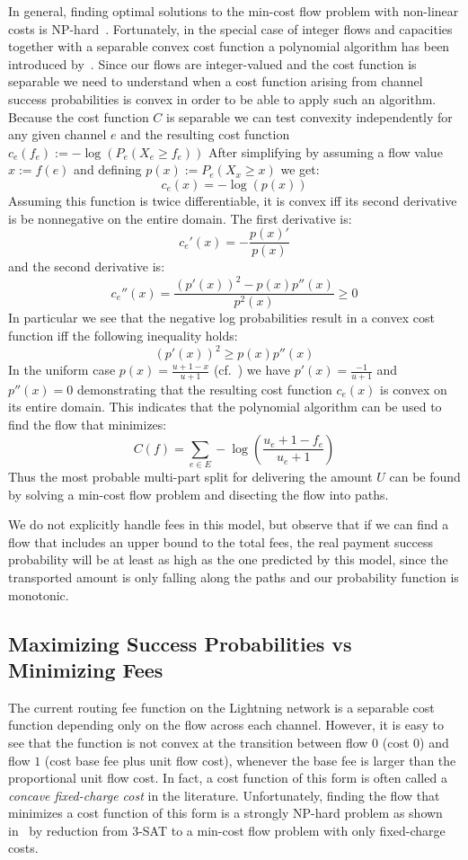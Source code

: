 \documentclass[10pt,twocolumn]{article}
\begin{document}
In general, finding optimal solutions to the min-cost flow problem with non-linear costs is NP-hard~\cite{guisewite1990minimum}. Fortunately, in the special case of integer flows and capacities together with a separable convex cost function a polynomial algorithm has been introduced by~\cite{Minoux1986}.
Since our flows are integer-valued and the cost function is separable we need to understand when a cost function arising from channel success probabilities is convex in order to be able to apply such an algorithm.
Because the cost function $C$ is separable we can test convexity independently for any given channel $e$ and the resulting cost function $c_e(f_e):=-\log\left(P_e(X_e\geq f_e)\right)$
After simplifying by assuming a flow value $x:=f(e)$ and defining $p(x):=P_e(X_x\geq x)$ we get:
\[
c_e(x)=-\log(p(x))
\]
Assuming this function is twice differentiable, it is convex iff its second derivative is be nonnegative on the entire domain.
The first derivative is:
\[
c_e'(x) = -\frac{p(x)'}{p(x)}
\]
and the second derivative is:
\[
c_e''(x) = \frac{(p'(x))^2-p(x)p''(x)}{{p^2(x)}} \geq 0
\]
In particular we see that the negative log probabilities result in a convex cost function iff the following inequality holds:
\[
(p'(x))^2 \geq p(x)p''(x)
\]
In the uniform case $p(x)=\frac{u+1-x}{u+1}$ (cf.~\cite{pickhardt2021security}) we have $p'(x)=\frac{-1}{u+1}$ and $p''(x)=0$ demonstrating that the resulting cost function $c_e(x)$ is convex on its entire domain.
This indicates that the polynomial algorithm can be used to find the flow that minimizes:
\[
C(f)=\sum_{e\in E}-\log\left(\frac{u_{e}+1-f_e}{u_{e}+1}\right)
\]
Thus the most probable multi-part split for delivering the amount $U$ can be found by solving a min-cost flow problem and disecting the flow into paths.

We do not explicitly handle fees in this model, but observe that if we can find a flow that includes an upper bound to the total fees, the real payment success probability will be at least as high as the one predicted by this model, since the transported amount is only falling along the paths and our probability function is monotonic.

\subsection{Maximizing Success Probabilities vs Minimizing Fees}
\label{fees}
The current routing fee function on the Lightning network is a separable cost function depending only on the flow across each channel.
However, it is easy to see that the function is not convex at the transition between flow $0$ (cost $0$) and flow $1$ (cost base fee plus unit flow cost), whenever the base fee is larger than the proportional unit flow cost. In fact, a cost function of this form is often called a \emph{concave fixed-charge cost} in the literature. Unfortunately, finding the flow that minimizes a cost function of this form is a strongly NP-hard problem as shown in~\cite{guisewite1990minimum} by reduction from 3-SAT to a min-cost flow problem with only fixed-charge costs.
\end{document}
